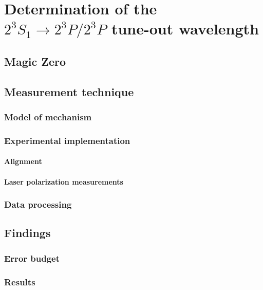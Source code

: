 \chapter{Determination  of the $2^{3\!}S_1 \rightarrow 2^{3\!}P/2^{3\!}P$ tune-out wavelength}
\section{Magic Zero}\label{sec:to-history}
\section{Measurement technique}\label{sec:to-method}
\subsection{Model of mechanism}\label{ssec:to-model}
\subsection{Experimental implementation}\label{ssec:to-expt}
\subsubsection*{Alignment}
\subsubsection*{Laser polarization measurements}
\subsection{Data processing}\label{ssec:to-proc}
\section{Findings}\label{sec:to-results}
\subsection{Error budget}\label{ssec:to-errs}
\subsection{Results}\label{ssec:to-findings}

